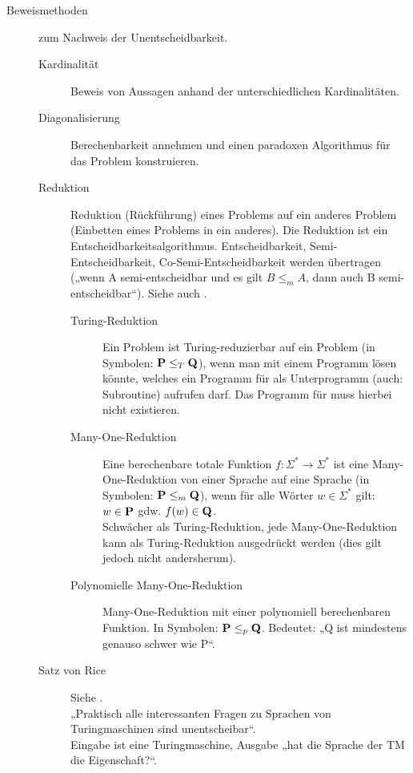 \begin{description}
        \item[Beweismethoden] zum Nachweis der Unentscheidbarkeit.
        \begin{description}
            \item[Kardinalität] Beweis von Aussagen anhand der unterschiedlichen Kardinalitäten.
            \item[Diagonalisierung] Berechenbarkeit annehmen und einen paradoxen Algorithmus für das Problem konstruieren.
            \item[Reduktion] Reduktion (Rückführung) eines Problems auf ein anderes Problem (Einbetten eines Problems in ein anderes). Die Reduktion ist ein Entscheid\-bar\-keits\-algorithmus. Entscheidbarkeit, Semi-Entscheidbarkeit, Co-Semi-Entscheidbarkeit werden übertragen („wenn A semi-entscheidbar und es gilt $B \leq_{m} A$, dann auch B semi-entscheidbar“). Siehe auch . 
                \begin{description}
                    \item[Turing-Reduktion] Ein Problem  ist Turing-reduzierbar auf ein Problem  (in Symbolen: $\textbf{P} \leq_T\textbf{Q}$), wenn man  mit einem Programm lösen könnte, welches ein Programm für  als Unterprogramm (auch: Subroutine) aufrufen darf. Das Programm für  muss hierbei nicht existieren.

                    \item[Many-One-Reduktion] Eine berechenbare totale Funktion $f: \Sigma^* \to \Sigma^*$ ist eine Many-One-Reduktion von einer Sprache  auf eine Sprache  (in Symbolen: $\textbf{P} \leq_m \textbf{Q}$), wenn für alle Wörter $w \in \Sigma^*$ gilt: $w \in \textbf{P}$ gdw. $f(w) \in \textbf{Q}$. \\
                    Schwächer als Turing-Reduktion, jede Many-One-Reduktion kann als Turing-Reduktion ausgedrückt werden (dies gilt jedoch nicht andersherum).

                    \item[Polynomielle Many-One-Reduktion] Many-One-Reduktion mit einer polynomiell berechenbaren Funktion. In Symbolen: $\textbf{P} \leq_{p} \textbf{Q}$. Bedeutet: „Q ist mindestens genauso schwer wie P“. 
                \end{description}
            \item[Satz von Rice] Siehe .  \\
                „Praktisch alle interessanten Fragen zu Sprachen von Turingmaschinen sind unentscheibar“. \\
                Eingabe ist eine Turingmaschine, Ausgabe „hat die Sprache der TM die Eigenschaft?“.
        \end{description}
    \end{description}


